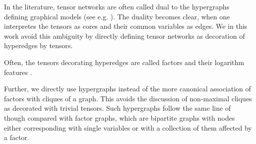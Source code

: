 \begin{remark}
In the literature, tensor networks are often called dual to the hypergraphs defining graphical models (see e.g. \cite{robeva_duality_2019}).
The duality becomes clear, when one interpretes the tensors as cores and their common variables as edges.
We in this work avoid this ambiguity by directly defining tensor networks as decoration of hyperedges by tensors.

Often, the tensors decorating hyperedges are called factors and their logarithm features \cite{koller_probabilistic_2009}.

Further, we directly use hypergraphs instead of the more canonical association of factors with cliques of a graph.
This avoids the discussion of non-maximal cliques as decorated with trivial tensors.
Such hypergraphs follow the same line of though compared with factor graphs, which are bipartite graphs with nodes either corresponding with single variables or with a collection of them affected by a factor.
\end{remark}








